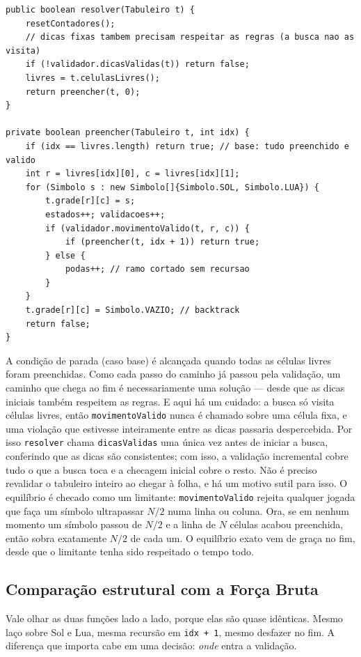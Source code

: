 \documentclass[12pt]{article}
\begin{document}
\begin{lstlisting}
public boolean resolver(Tabuleiro t) {
    resetContadores();
    // dicas fixas tambem precisam respeitar as regras (a busca nao as visita)
    if (!validador.dicasValidas(t)) return false;
    livres = t.celulasLivres();
    return preencher(t, 0);
}

private boolean preencher(Tabuleiro t, int idx) {
    if (idx == livres.length) return true; // base: tudo preenchido e valido
    int r = livres[idx][0], c = livres[idx][1];
    for (Simbolo s : new Simbolo[]{Simbolo.SOL, Simbolo.LUA}) {
        t.grade[r][c] = s;
        estados++; validacoes++;
        if (validador.movimentoValido(t, r, c)) {
            if (preencher(t, idx + 1)) return true;
        } else {
            podas++; // ramo cortado sem recursao
        }
    }
    t.grade[r][c] = Simbolo.VAZIO; // backtrack
    return false;
}
\end{lstlisting}

A condição de parada (caso base) é alcançada quando todas as células livres foram preenchidas. Como cada passo do caminho já passou pela validação, um caminho que chega ao fim é necessariamente uma solução --- desde que as dicas iniciais também respeitem as regras. E aqui há um cuidado: a busca só visita células livres, então \texttt{movimentoValido} nunca é chamado sobre uma célula fixa, e uma violação que estivesse inteiramente entre as dicas passaria despercebida. Por isso \texttt{resolver} chama \texttt{dicasValidas} uma única vez antes de iniciar a busca, conferindo que as dicas são consistentes; com isso, a validação incremental cobre tudo o que a busca toca e a checagem inicial cobre o resto. Não é preciso revalidar o tabuleiro inteiro ao chegar à folha, e há um motivo sutil para isso. O equilíbrio é checado como um limitante: \texttt{movimentoValido} rejeita qualquer jogada que faça um símbolo ultrapassar $N/2$ numa linha ou coluna. Ora, se em nenhum momento um símbolo passou de $N/2$ e a linha de $N$ células acabou preenchida, então sobra exatamente $N/2$ de cada um. O equilíbrio exato vem de graça no fim, desde que o limitante tenha sido respeitado o tempo todo.

\subsection{Comparação estrutural com a Força Bruta}
\label{sec:comparacao}

Vale olhar as duas funções lado a lado, porque elas são quase idênticas. Mesmo laço sobre Sol e Lua, mesma recursão em \texttt{idx + 1}, mesmo desfazer no fim. A diferença que importa cabe em uma decisão: \emph{onde} entra a validação.
\end{document}
